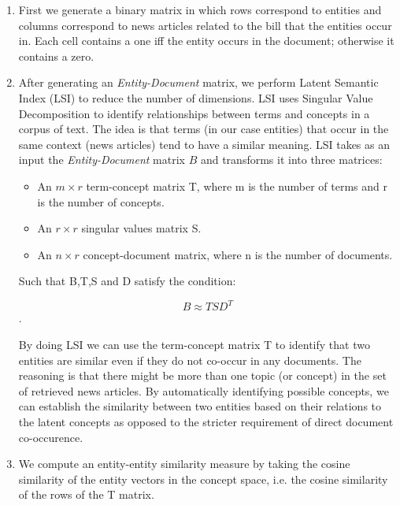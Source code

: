 \begin{enumerate} 
\item First we generate a binary matrix in which rows correspond to entities and columns correspond to news articles related to the bill that the entities occur in. Each cell contains a one iff the entity occurs in the document; otherwise it contains a zero.   
\item After generating an \emph{Entity-Document} matrix, we perform Latent Semantic Index (LSI) to reduce the number of dimensions. LSI uses Singular Value Decomposition to identify relationships between terms and concepts in a corpus of text. The idea is that terms (in our case entities) that occur in the same context (news articles) tend to have a similar meaning. LSI takes as an input the \emph{Entity-Document} matrix $B$ and transforms it into three matrices: 

\begin{itemize}
\item An $m\times r$ term-concept matrix T, where m is the number of terms and r is the number of concepts.
\item An $r\times r$ singular values matrix S. 
\item An $n\times r$ concept-document matrix, where n is the number of documents.
\end{itemize}

Such that B,T,S and D satisfy the condition:

$$ B \approx TSD^T $$.

By doing LSI we can use the term-concept matrix T to identify that two entities are similar even if they do not co-occur in any documents. The reasoning is that there might be more than one topic (or concept) in the set of retrieved news articles. By automatically identifying possible concepts, we can establish the similarity between two entities based on their relations to the latent concepts as opposed to the stricter requirement of direct document co-occurence.

\item We compute an entity-entity similarity measure by taking the cosine similarity of the entity vectors in the concept space, i.e. the cosine similarity of the rows of the T matrix.

\end{enumerate} 

